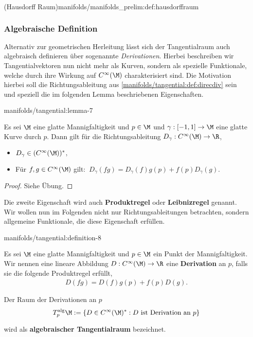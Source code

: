 \documentclass[letterpaper,10pt,english]{jupyterBook}
\begin{document}
\begin{definition}{(Hausdorff Raum)}{manifolds/manifolds_prelim:def:hausdorffraum}
\subsubsection{Algebraische Definition}
\label{\detokenize{manifolds/tangential:algebraische-definition}}
\par
Alternativ zur geometrischen Herleitung lässt sich der Tangentialraum auch algebraisch definieren über sogenannte \emph{Derivationen}.
Hierbei beschreiben wir Tangentialvektoren nun nicht mehr als Kurven, sondern als spezielle Funktionale, welche durch ihre Wirkung auf \(C^\infty(\M)\) charakterisiert sind.
Die Motivation hierbei soll die Richtungsableitung aus \cref{manifolds/tangential:def:direcdiv} sein und speziell die im folgenden Lemma beschriebenen Eigenschaften.
\begin{lemma}{}{manifolds/tangential:lemma-7}



\par
Es sei \(\M\) eine glatte Mannigfaltigkeit und \(p\in\M\) und \(\gamma:[-1,1]\to\M\) eine glatte Kurve durch \(p\).
Dann gilt für die Richtungsableitung \(D_\gamma:C^\infty(\M)\to\R\),
\begin{itemize}
\item {} 
\par
\(D_\gamma\in (C^\infty(\M))^\ast\),

\item {} 
\par
Für \(f,g\in C^\infty(\M)\) gilt: \(\ D_\gamma(fg) = D_\gamma(f) g(p) + f(p) D_\gamma(g)\).

\end{itemize}
\end{lemma}

\begin{proof}
 Siehe Übung.
\end{proof}

\par
Die zweite Eigenschaft wird auch \textbf{Produktregel} oder \textbf{Leibnizregel} genannt.
Wir wollen nun im Folgenden nicht nur Richtungsableitungen betrachten, sondern allgemeine Funktionale, die diese Eigenschaft erfüllen.
\begin{definition}{}{manifolds/tangential:definition-8}



\par
Es sei \(\M\) eine glatte Mannigfaltigkeit und \(p\in\M\) ein Punkt der Mannigfaltigkeit.
Wir nennen eine lineare Abbildung \(D: C^\infty(\M) \to \R\) eine \textbf{Derivation} an \(p\), falls sie die folgende Produktregel erfüllt,
\begin{align*}
D(fg) = D(f) g(p) + f(p) D(g).
\end{align*}
\par
Der Raum der Derivationen an \(p\)
\begin{align*}
T^{\text{alg}}_p\M := \{D\in C^\infty(\M)^\ast: D\text{ ist Derivation an }p\}
\end{align*}
\par
wird als \textbf{algebraischer Tangentialraum} bezeichnet.
\end{definition}


\end{definition}
\end{document}
